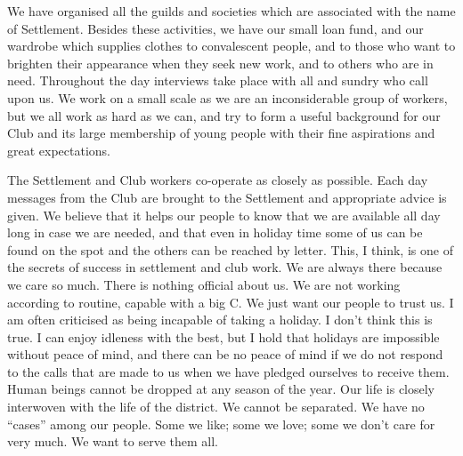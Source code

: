 We have organised all the guilds and societies which
are associated with the name of Settlement. Besides these
activities, we have our small loan fund, and our wardrobe
which supplies clothes to convalescent people, and to
those who want to brighten their appearance when they
seek new work, and to others who are in need. Throughout
the day interviews take place with all and sundry who
call upon us. We work on a small scale as we are an inconsiderable
group of workers, but we all work as hard as
we can, and try to form a useful background for our Club
and its large membership of young people with their fine
aspirations and great expectations.

The Settlement and Club workers co-operate as closely
as possible. Each day messages from the Club are brought
to the Settlement and appropriate advice is given. We
believe that it helps our people to know that we are
available all day long in case we are needed, and that
even in holiday time some of us can be found on the spot
and the others can be reached by letter. This, I think,
is one of the secrets of success in settlement and club
work. We are always there because we care so much.
There is nothing official about us. We are not working
according to routine, capable with a big C\@. We just
want our people to trust us. I am often criticised as
being incapable of taking a holiday. I don’t think this
is true. I can enjoy idleness with the best, but I hold
that holidays are impossible without peace of mind, and
there can be no peace of mind if we do not respond to
the calls that are made to us when we have pledged
ourselves to receive them. Human beings cannot be dropped
at any season of the year. Our life is closely interwoven
with the life of the district. We cannot be separated.
We have no “cases” among our people. Some we like;
some we love; some we don’t care for very much. We
want to serve them all.

